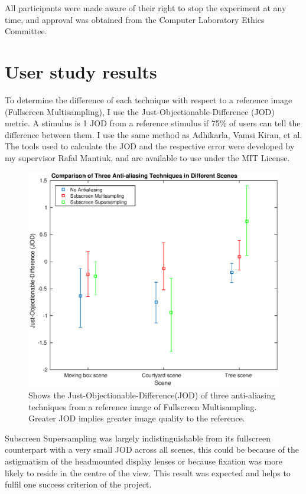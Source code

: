 \documentclass[12pt,a4paper,twoside,openright]{report}
\begin{document}
All participants were made aware of their right to stop the experiment at any time, and approval was obtained from the Computer Laboratory Ethics Committee. 

\section{User study results}\label{studyResults}

To determine the difference of each technique with respect to a reference image (Fullscreen Multisampling), I use the Just-Objectionable-Difference (JOD) metric. A stimulus is 1 JOD from a reference stimulus if 75\% of users can tell the difference between them. I use the same method as Adhikarla, Vamsi Kiran, et al\cite{rafalPaper}. The tools used to calculate the JOD and the respective error were developed by my supervisor Rafal Mantiuk, and are available to use under the MIT License\cite{pwcomp}. 

\begin{figure}[tbh]
\centerline{\includegraphics[width=14cm]{figs/jod.eps}}
\caption{Shows the Just-Objectionable-Difference(JOD) of three anti-aliasing techniques from a reference image of Fullscreen Multisampling. Greater JOD implies greater image quality to the reference.}
\label{fig:jod}
\end{figure}

Subscreen Supersampling was largely indistinguishable from its fullscreen counterpart with a very small JOD across all scenes, this could be because of the astigmatism of the headmounted display lenses or because fixation was more likely to reside in the centre of the view. This result was expected and helps to fulfil one success criterion of the project. 
\end{document}
